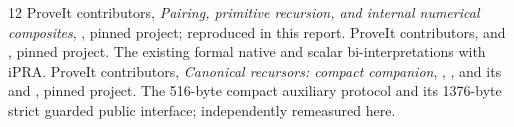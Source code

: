 \documentclass[11pt,letterpaper]{article}
\theoremstyle{definition}
\begin{document}
\begin{thebibliography}{12}
ProveIt contributors, \emph{Pairing, primitive recursion, and internal
numerical composites},
,
pinned project; reproduced in this report.
ProveIt contributors, 
and , pinned project.
The existing formal native and scalar bi-interpretations with iPRA.
ProveIt contributors, \emph{Canonical recursors: compact companion},
,
, and its
 and
, pinned project.
The 516-byte compact auxiliary protocol and its 1376-byte
strict guarded public interface; independently remeasured here.
\end{thebibliography}
\end{document}
